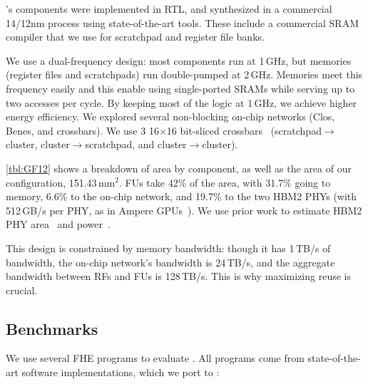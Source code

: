 \name's components were implemented in RTL,
and synthesized in a commercial 14/12nm process using state-of-the-art tools.
These include a commercial SRAM compiler that we use for scratchpad and register file banks.

We use a dual-frequency design: most components run at 1\,GHz,
but memories (register files and scratchpads)
run double-pumped at 2\,GHz.
Memories meet this frequency easily and this enable using single-ported SRAMs while serving up to two accesses per cycle.
%
By keeping most of the logic at 1\,GHz, we achieve higher energy efficiency.
%
We explored several non-blocking on-chip networks (Clos, Benes, and crossbars).
We use 3 16$\times$16 bit-sliced crossbars~\cite{passas:tocaid12:crossbar} (scratch\-pad$\rightarrow$cluster, cluster$\rightarrow$scratchpad, and cluster$\rightarrow$cluster). %

\autoref{tbl:GF12} shows a breakdown of area by component, as well as the area of our \name configuration,
151.43\,mm$^2$.
FUs take 42\% of the area, with 31.7\% going to memory,
6.6\% to the on-chip network, and 19.7\% to the two HBM2 PHYs
(with 512\,GB/s per PHY, as in Ampere GPUs~\cite{choquette2021nvidia}).
We use prior work to estimate HBM2 PHY area~\cite{rambuswhite, dasgupta20208} and power~\cite{rambuswhite, ge2011design}.

\tblGF %

This design is constrained by memory bandwidth: though it has 1\,TB/s of bandwidth,
the on-chip network's bandwidth is 24\,TB/s, and the aggregate bandwidth between RFs and FUs is 128\,TB/s.
This is why maximizing reuse is crucial.

\subsection{Benchmarks} \label{sec:benchmarks}
We use several FHE programs to evaluate \name. %
All programs come from state-of-the-art software implementations, which we port to \name:

